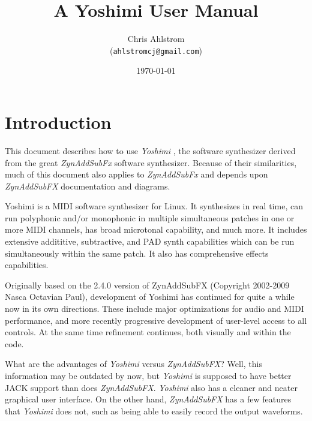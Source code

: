 \documentclass[
 11pt,
 twoside,
 a4paper,
 headinclude,
 footinclude,
 final                                 %
]{article}
\begin{document}
\title{A Yoshimi User Manual}
\author{Chris Ahlstrom\\
   (\texttt{ahlstromcj@gmail.com})}
\date{\today}
\maketitle
\tableofcontents
\listoffigures                         %
\listoftables                          %


\setlength{\parindent}{0pt}
\setlength{\parskip}{1ex plus 0.5ex minus 0.2ex}

\section{Introduction}
\label{sec:introduction}

   This document describes how to use \textsl{Yoshimi} \cite{yoshimi},
   the software synthesizer derived from the great
   \textsl{ZynAddSubFx} \cite{zynaddsubfx} software
   synthesizer.  Because of their similarities, much of this document also
   applies to \textsl{ZynAddSubFx} and depends upon \textsl{ZynAddSubFX}
   documentation and diagrams.

   Yoshimi is a MIDI software synthesizer for Linux. It synthesizes in real
   time, can run polyphonic and/or monophonic in multiple simultaneous
   patches in one or more MIDI channels, has broad microtonal capability,
   and much more. It includes extensive addititive, subtractive, and PAD
   synth capabilities which can be run simultaneously within the same patch.
   It also has comprehensive effects capabilities.

   Originally based on the 2.4.0 version of ZynAddSubFX (Copyright 2002-2009
   Nasca Octavian Paul), development of Yoshimi has continued for
   quite a while now in its own directions. These include major
   optimizations for audio and MIDI performance, and more recently
   progressive development of user-level access to all controls. At the same
   time refinement continues, both visually and within the code.

   What are the advantages of
   \textsl{Yoshimi} versus \textsl{ZynAddSubFX}?
   Well, this information may be outdated by now, but 
   \textsl{Yoshimi} is supposed to have better JACK support
   than does \textsl{ZynAddSubFX}.
   \textsl{Yoshimi} also has a cleaner and neater graphical user interface.
   On the other hand, \textsl{ZynAddSubFX} has a few features that
   \textsl{Yoshimi} does not, such as being able to easily record
   the output waveforms.
\end{document}
